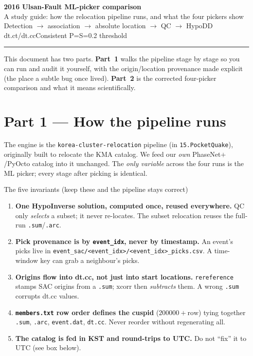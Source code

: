 \documentclass[11pt]{article}
\begin{document}
\begin{center}
{\huge\bfseries\sffamily\color{accent} 2016 Ulsan-Fault ML-picker comparison}\\[2mm]
{\large\sffamily A study guide: how the relocation pipeline runs, and what the four pickers show}\\[2mm]
{\small\color{soft} Detection $\rightarrow$ association $\rightarrow$ absolute location $\rightarrow$ QC $\rightarrow$ HypoDD dt.ct/dt.cc\hfill Consistent P{=}S{=}0.2 threshold}
\end{center}
\vspace{2mm}
\hrule
\vspace{4mm}

This document has two parts. \textbf{Part~1} walks the pipeline stage by stage so you can run and
audit it yourself, with the origin/location provenance made explicit (the place a subtle bug once
lived). \textbf{Part~2} is the corrected four-picker comparison and what it means scientifically.

\section{Part 1 — How the pipeline runs}

The engine is the \texttt{korea-cluster-relocation} pipeline (in \texttt{15.PocketQuake}), originally
built to relocate the KMA catalog. We feed our \emph{own} PhaseNet$+$/PyOcto catalog into it unchanged.
The \emph{only variable} across the four runs is the ML picker; every stage after picking is identical.

\begin{keybox}{The five invariants (keep these and the pipeline stays correct)}
\begin{enumerate}[leftmargin=6mm,itemsep=1mm]
\item \textbf{One HypoInverse solution, computed once, reused everywhere.} QC only \emph{selects} a
subset; it never re-locates. The subset relocation reuses the full-run \texttt{.sum}/\texttt{.arc}.
\item \textbf{Pick provenance is by \texttt{event\_idx}, never by timestamp.} An event's picks live in
\texttt{event\_sac/<event\_idx>/<event\_idx>\_picks.csv}. A time-window key can grab a neighbour's picks.
\item \textbf{Origins flow into dt.cc, not just into start locations.} \texttt{rereference} stamps SAC
origins from a \texttt{.sum}; xcorr then \emph{subtracts} them. A wrong \texttt{.sum} corrupts dt.cc values.
\item \textbf{\texttt{members.txt} row order defines the cuspid} ($200000+\text{row}$) tying together
\texttt{.sum}, \texttt{.arc}, \texttt{event.dat}, \texttt{dt.cc}. Never reorder without regenerating all.
\item \textbf{The catalog is fed in KST and round-trips to UTC.} Do not ``fix'' it to UTC (see box below).
\end{enumerate}
\end{keybox}
\end{document}
